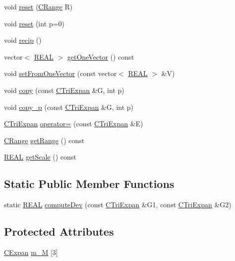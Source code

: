 \begin{DoxyCompactItemize}
\item 
void \hyperlink{classCTriExpan_a2abfca44411177f675cf9de0c5d96319}{reset} (\hyperlink{classCRange}{C\-Range} R)
\item 
void \hyperlink{classCTriExpan_a3afaa15f79472c486cb03af999292b68}{reset} (int p=0)
\item 
void \hyperlink{classCTriExpan_ada91fb0b3d1a9affe583996f3ef25d35}{recip} ()
\item 
vector$<$ \hyperlink{util_8h_a5821460e95a0800cf9f24c38915cbbde}{R\-E\-A\-L} $>$ \hyperlink{classCTriExpan_af35f34a4844423b37a4569e14caa04e8}{get\-One\-Vector} () const 
\item 
void \hyperlink{classCTriExpan_abe36fdfa4160421b9f9c4c6ae5c8818f}{set\-From\-One\-Vector} (const vector$<$ \hyperlink{util_8h_a5821460e95a0800cf9f24c38915cbbde}{R\-E\-A\-L} $>$ \&V)
\item 
void \hyperlink{classCTriExpan_a4f357cf3964776ee907370e054b25740}{copy} (const \hyperlink{classCTriExpan}{C\-Tri\-Expan} \&G, int p)
\item 
void \hyperlink{classCTriExpan_a21a9c70172ba7224c77bfa53dca8a177}{copy\-\_\-p} (const \hyperlink{classCTriExpan}{C\-Tri\-Expan} \&G, int p)
\item 
\hyperlink{classCTriExpan}{C\-Tri\-Expan} \hyperlink{classCTriExpan_afbe552370cd3a3f9f65742224d86bb16}{operator=} (const \hyperlink{classCTriExpan}{C\-Tri\-Expan} \&E)
\item 
\hyperlink{classCRange}{C\-Range} \hyperlink{classCTriExpan_a26a23540d1a6ad3547a370d10fb84a7e}{get\-Range} () const 
\item 
\hyperlink{util_8h_a5821460e95a0800cf9f24c38915cbbde}{R\-E\-A\-L} \hyperlink{classCTriExpan_a3fe2b894d13e1b698c3c76b82d00548c}{get\-Scale} () const 
\end{DoxyCompactItemize}
\subsection*{Static Public Member Functions}
\begin{DoxyCompactItemize}
\item 
static \hyperlink{util_8h_a5821460e95a0800cf9f24c38915cbbde}{R\-E\-A\-L} \hyperlink{classCTriExpan_a44e821fcef7cf9c02714d71772e7cbb9}{compute\-Dev} (const \hyperlink{classCTriExpan}{C\-Tri\-Expan} \&G1, const \hyperlink{classCTriExpan}{C\-Tri\-Expan} \&G2)
\end{DoxyCompactItemize}
\subsection*{Protected Attributes}
\begin{DoxyCompactItemize}
\item 
\hyperlink{classCExpan}{C\-Expan} \hyperlink{classCTriExpan_af8c7f3af976ff622b46ed050a1b3624d}{m\-\_\-\-M} \mbox{[}3\mbox{]}
\end{DoxyCompactItemize}
